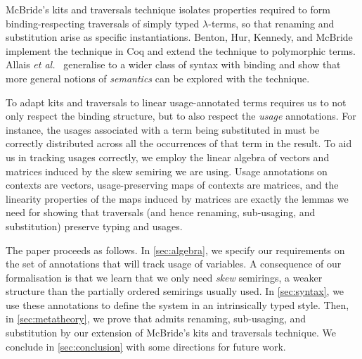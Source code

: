 \documentclass[submission,copyright,creativecommons]{eptcs}
\begin{document}
McBride's kits and traversals technique isolates properties required
to form binding-respecting traversals of simply typed $\lambda$-terms,
so that renaming and substitution arise as specific
instantiations. Benton, Hur, Kennedy, and McBride \cite{bhkm12}
implement the technique in Coq and extend the technique to polymorphic
terms. Allais \emph{et al.}~\cite{AACMM20} generalise to a wider class
of syntax with binding and show that more general notions of
\emph{semantics} can be explored with the technique.

To adapt kits and traversals to linear usage-annotated terms requires
us to not only respect the binding structure, but to also respect the
\emph{usage} annotations. For instance, the usages associated with a
term being substituted in must be correctly distributed across all the
occurrences of that term in the result. To aid us in tracking usages
correctly, we employ the linear algebra of vectors and matrices
induced by the skew semiring we are using. Usage annotations on
contexts are vectors, usage-preserving maps of contexts are matrices,
and the linearity properties of the maps induced by matrices are
exactly the lemmas we need for showing that traversals (and hence
renaming, sub-usaging, and substitution) preserve typing and usages.



The paper proceeds as follows.
In \autoref{sec:algebra}, we specify our requirements on the set of annotations
that will track usage of variables. A consequence of our formalisation is that we learn that we only need \emph{skew} semirings, a weaker structure than the partially ordered semirings usually used.
In \autoref{sec:syntax}, we use these annotations to define the system
\name{} in an intrinsically typed style.
Then, in \autoref{sec:metatheory}, we prove that \name{} admits renaming, sub-usaging, and
substitution by our extension of McBride's kits and traversals technique.
We conclude in \autoref{sec:conclusion} with some directions for future work.
\end{document}
